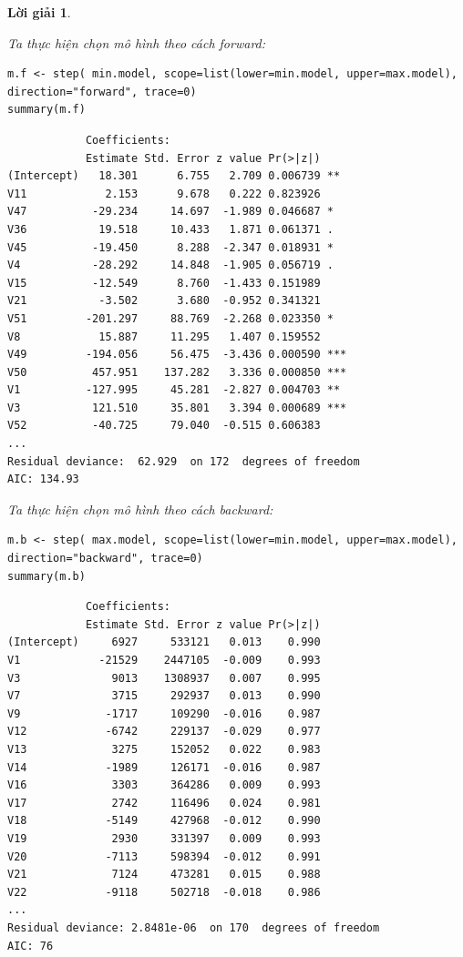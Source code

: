 \documentclass[14pt, a4paper]{article}
\theoremstyle{sltheorem}
\theoremstyle{soltheorem}
\newtheorem*{loigiai}{Lời giải}
\begin{document}
\begin{loigiai}
\begin{itemize}
        Ta thực hiện chọn mô hình theo cách forward:

        \begin{verbatim}
m.f <- step( min.model, scope=list(lower=min.model, upper=max.model), direction="forward", trace=0)
summary(m.f)
        \end{verbatim}
        
        \begin{verbatim}
            Coefficients:
            Estimate Std. Error z value Pr(>|z|)    
(Intercept)   18.301      6.755   2.709 0.006739 ** 
V11            2.153      9.678   0.222 0.823926    
V47          -29.234     14.697  -1.989 0.046687 *  
V36           19.518     10.433   1.871 0.061371 .  
V45          -19.450      8.288  -2.347 0.018931 *  
V4           -28.292     14.848  -1.905 0.056719 .  
V15          -12.549      8.760  -1.433 0.151989    
V21           -3.502      3.680  -0.952 0.341321    
V51         -201.297     88.769  -2.268 0.023350 *  
V8            15.887     11.295   1.407 0.159552    
V49         -194.056     56.475  -3.436 0.000590 ***
V50          457.951    137.282   3.336 0.000850 ***
V1          -127.995     45.281  -2.827 0.004703 ** 
V3           121.510     35.801   3.394 0.000689 ***
V52          -40.725     79.040  -0.515 0.606383    
...
Residual deviance:  62.929  on 172  degrees of freedom
AIC: 134.93
        \end{verbatim}

        Ta thực hiện chọn mô hình theo cách backward:

        \begin{verbatim}
m.b <- step( max.model, scope=list(lower=min.model, upper=max.model), direction="backward", trace=0)
summary(m.b)
        \end{verbatim}

        \begin{verbatim}
            Coefficients:
            Estimate Std. Error z value Pr(>|z|)
(Intercept)     6927     533121   0.013    0.990
V1            -21529    2447105  -0.009    0.993
V3              9013    1308937   0.007    0.995
V7              3715     292937   0.013    0.990
V9             -1717     109290  -0.016    0.987
V12            -6742     229137  -0.029    0.977
V13             3275     152052   0.022    0.983
V14            -1989     126171  -0.016    0.987
V16             3303     364286   0.009    0.993
V17             2742     116496   0.024    0.981
V18            -5149     427968  -0.012    0.990
V19             2930     331397   0.009    0.993
V20            -7113     598394  -0.012    0.991
V21             7124     473281   0.015    0.988
V22            -9118     502718  -0.018    0.986
...
Residual deviance: 2.8481e-06  on 170  degrees of freedom
AIC: 76
        \end{verbatim}


\end{itemize}
\end{loigiai}
\end{document}
